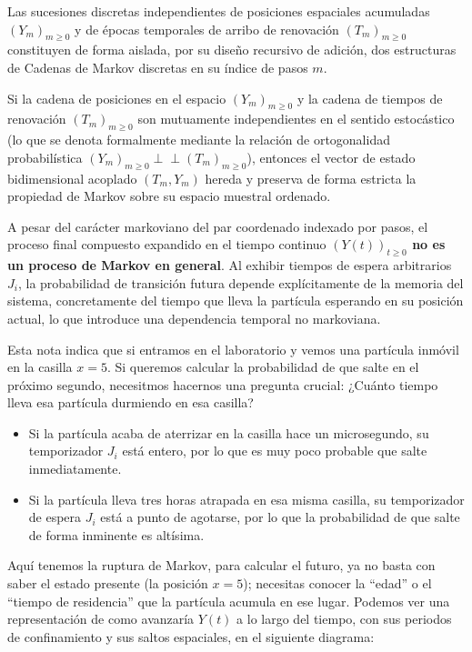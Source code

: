 \begin{observacion}
Las sucesiones discretas independientes de posiciones espaciales acumuladas $(Y_m)_{m \ge 0}$ y de épocas temporales de arribo de renovación $(T_m)_{m \ge 0}$ constituyen de forma aislada, por su diseño recursivo de adición, dos estructuras de Cadenas de Markov discretas en su índice de pasos $m$.
\end{observacion}

\begin{prop}
Si la cadena de posiciones en el espacio $(Y_m)_{m \ge 0}$ y la cadena de tiempos de renovación $(T_m)_{m \ge 0}$ son mutuamente independientes en el sentido estocástico (lo que se denota formalmente mediante la relación de ortogonalidad probabilística $(Y_m)_{m \ge 0} \perp \!\!\! \perp (T_m)_{m \ge 0}$), entonces el vector de estado bidimensional acoplado $(T_m, Y_m)$ hereda y preserva de forma estricta la propiedad de Markov sobre su espacio muestral ordenado.
\end{prop}

\begin{observacion}
A pesar del carácter markoviano del par coordenado indexado por pasos, el proceso final compuesto expandido en el tiempo continuo \textbf{$(Y(t))_{t \ge 0}$ no es un proceso de Markov en general}. Al exhibir tiempos de espera arbitrarios $J_i$, la probabilidad de transición futura depende explícitamente de la memoria del sistema, concretamente del tiempo que lleva la partícula esperando en su posición actual, lo que introduce una dependencia temporal no markoviana. \\
\end{observacion}
\noindent
Esta nota indica que si entramos en el laboratorio y vemos una partícula inmóvil en la casilla $x = 5$. Si queremos calcular la probabilidad de que salte en el próximo segundo, necesitmos hacernos una pregunta crucial: ¿Cuánto tiempo lleva esa partícula durmiendo en esa casilla?
\begin{itemize}
    \item Si la partícula acaba de aterrizar en la casilla hace un microsegundo, su temporizador $J_i$ está entero, por lo que es muy poco probable que salte inmediatamente.
    \item Si la partícula lleva tres horas atrapada en esa misma casilla, su temporizador de espera $J_i$ está a punto de agotarse, por lo que la probabilidad de que salte de forma inminente es altísima.
\end{itemize}
Aquí tenemos la ruptura de Markov, para calcular el futuro, ya no basta con saber el estado presente (la posición $x=5$); necesitas conocer la ``edad'' o el ``tiempo de residencia'' que la partícula acumula en ese lugar. Podemos ver una representación de como avanzaría $Y(t)$ a lo largo del tiempo, con sus periodos de confinamiento y sus saltos espaciales, en el siguiente diagrama:


